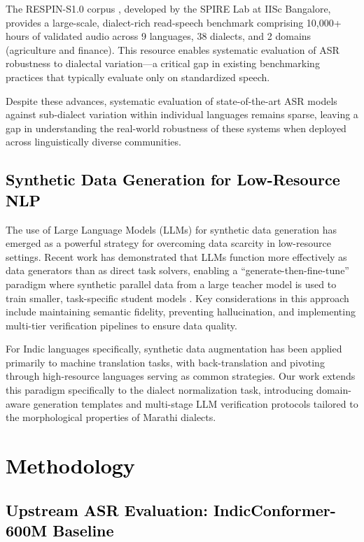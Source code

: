 The RESPIN-S1.0 corpus \cite{singh2024respin}, developed by the SPIRE Lab at IISc Bangalore, provides a large-scale, dialect-rich read-speech benchmark comprising 10,000+ hours of validated audio across 9 languages, 38 dialects, and 2 domains (agriculture and finance). This resource enables systematic evaluation of ASR robustness to dialectal variation---a critical gap in existing benchmarking practices that typically evaluate only on standardized speech.

Despite these advances, systematic evaluation of state-of-the-art ASR models against sub-dialect variation within individual languages remains sparse, leaving a gap in understanding the real-world robustness of these systems when deployed across linguistically diverse communities.

\subsection{\textcolor{black}{Synthetic Data Generation for Low-Resource NLP}}

The use of Large Language Models (LLMs) for synthetic data generation has emerged as a powerful strategy for overcoming data scarcity in low-resource settings. Recent work has demonstrated that LLMs function more effectively as data generators than as direct task solvers, enabling a ``generate-then-fine-tune'' paradigm where synthetic parallel data from a large teacher model is used to train smaller, task-specific student models \cite{gemma2024}. Key considerations in this approach include maintaining semantic fidelity, preventing hallucination, and implementing multi-tier verification pipelines to ensure data quality.

For Indic languages specifically, synthetic data augmentation has been applied primarily to machine translation tasks, with back-translation and pivoting through high-resource languages serving as common strategies. Our work extends this paradigm specifically to the dialect normalization task, introducing domain-aware generation templates and multi-stage LLM verification protocols tailored to the morphological properties of Marathi dialects.

\section{\textcolor{black}{Methodology}}
\label{sec:methodology}

\subsection{\textcolor{black}{Upstream ASR Evaluation: IndicConformer-600M Baseline}}
\label{sec:asr_eval}

